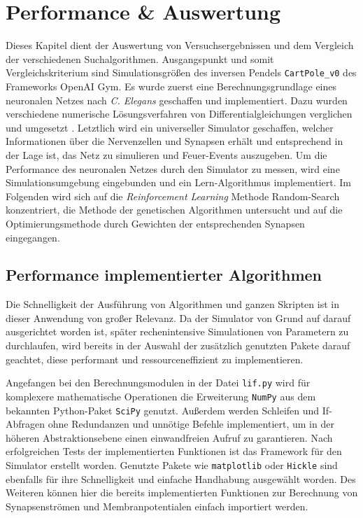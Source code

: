 %
\chapter{Performance \& Auswertung}
\label{chap:erg}
%
	Dieses Kapitel dient der Auswertung von Versuchsergebnissen und dem Vergleich der verschiedenen Suchalgorithmen. Ausgangspunkt und somit Vergleichskriterium sind Simulationsgrößen des inversen Pendels \texttt{CartPole\_v0} des Frameworks OpenAI Gym.	Es wurde zuerst eine Berechnungsgrundlage eines neuronalen Netzes nach \textit{C. Elegans} \cite{CElegans} geschaffen und implementiert. Dazu wurden verschiedene numerische Lösungsverfahren von Differentialgleichungen verglichen und umgesetzt \cite{NonlinearDynamics}. Letztlich wird ein universeller Simulator geschaffen, welcher Informationen über die Nervenzellen und Synapsen erhält und entsprechend in der Lage ist, das Netz zu simulieren und Feuer-Events auszugeben. Um die Performance des neuronalen Netzes durch den Simulator zu messen, wird eine Simulationsumgebung eingebunden und ein Lern-Algorithmus implementiert. Im Folgenden wird sich auf die \textit{Reinforcement Learning} Methode Random-Search konzentriert, die Methode der genetischen Algorithmen untersucht und auf die Optimierungsmethode durch Gewichten der entsprechenden Synapsen eingegangen.

\section{Performance implementierter Algorithmen}
\label{sec:erg_performance}
	Die Schnelligkeit der Ausführung von Algorithmen und ganzen Skripten ist in dieser Anwendung von großer Relevanz. Da der Simulator von Grund auf darauf ausgerichtet worden ist, später rechenintensive Simulationen von Parametern zu durchlaufen, wird bereits in der Auswahl der zusätzlich genutzten Pakete darauf geachtet, diese performant und ressourceneffizient zu implementieren.
	
	Angefangen bei den Berechnungsmodulen in der Datei \texttt{lif.py} wird für komplexere mathematische Operationen die Erweiterung \texttt{NumPy} \cite{NumPy} aus dem bekannten Python-Paket \texttt{SciPy} \cite{NumPy} genutzt. Außerdem werden Schleifen und If-Abfragen ohne Redundanzen und unnötige Befehle implementiert, um in der höheren Abstraktionsebene einen einwandfreien Aufruf zu garantieren. Nach erfolgreichen Tests der implementierten Funktionen ist das Framework für den Simulator erstellt worden. Genutzte Pakete wie \texttt{matplotlib} \cite{Hunter2007} oder \texttt{Hickle} \cite{hdf5} sind ebenfalls für ihre Schnelligkeit und einfache Handhabung ausgewählt worden. Des Weiteren können hier die bereits implementierten Funktionen zur Berechnung von Synapsenströmen und Membranpotentialen einfach importiert werden.
	
